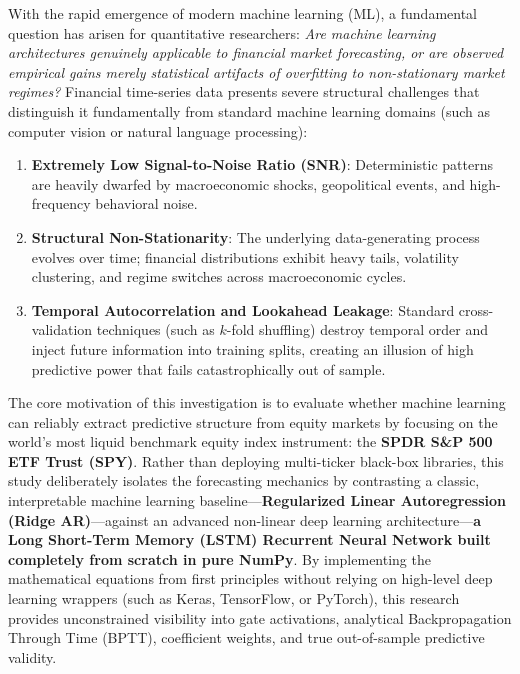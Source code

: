 \documentclass[11pt,letterpaper]{article}
\begin{document}
With the rapid emergence of modern machine learning (ML), a fundamental question has arisen for quantitative researchers: \textit{Are machine learning architectures genuinely applicable to financial market forecasting, or are observed empirical gains merely statistical artifacts of overfitting to non-stationary market regimes?} Financial time-series data presents severe structural challenges that distinguish it fundamentally from standard machine learning domains (such as computer vision or natural language processing):
\begin{enumerate}[leftmargin=*,itemsep=2pt,topsep=2pt]
    \item \textbf{Extremely Low Signal-to-Noise Ratio (SNR)}: Deterministic patterns are heavily dwarfed by macroeconomic shocks, geopolitical events, and high-frequency behavioral noise.
    \item \textbf{Structural Non-Stationarity}: The underlying data-generating process evolves over time; financial distributions exhibit heavy tails, volatility clustering, and regime switches across macroeconomic cycles.
    \item \textbf{Temporal Autocorrelation and Lookahead Leakage}: Standard cross-validation techniques (such as $k$-fold shuffling) destroy temporal order and inject future information into training splits, creating an illusion of high predictive power that fails catastrophically out of sample.
\end{enumerate}

The core motivation of this investigation is to evaluate whether machine learning can reliably extract predictive structure from equity markets by focusing on the world's most liquid benchmark equity index instrument: the \textbf{SPDR S\&P 500 ETF Trust (SPY)}. Rather than deploying multi-ticker black-box libraries, this study deliberately isolates the forecasting mechanics by contrasting a classic, interpretable machine learning baseline---\textbf{Regularized Linear Autoregression (Ridge AR)}---against an advanced non-linear deep learning architecture---\textbf{a Long Short-Term Memory (LSTM) Recurrent Neural Network built completely from scratch in pure NumPy}. By implementing the mathematical equations from first principles without relying on high-level deep learning wrappers (such as Keras, TensorFlow, or PyTorch), this research provides unconstrained visibility into gate activations, analytical Backpropagation Through Time (BPTT), coefficient weights, and true out-of-sample predictive validity.
\end{document}
